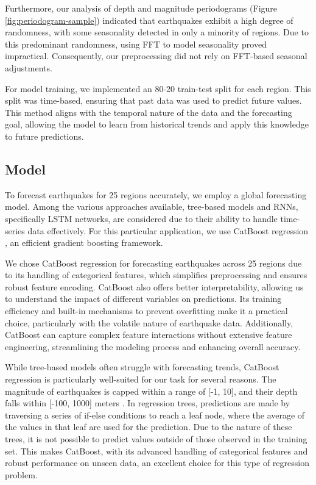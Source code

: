 Furthermore, our analysis of depth and magnitude periodograms (Figure \ref{fig:periodogram-sample})
indicated that earthquakes
exhibit a high degree of randomness, with some seasonality detected in only a minority
of regions. Due to this predominant randomness, using \ac{FFT}
to model seasonality proved impractical. Consequently, our preprocessing did not
rely on \ac{FFT}-based seasonal adjustments.

For model training, we implemented an 80-20 train-test split for each region. This
split was time-based, ensuring that past data was used to predict future values.
This method aligns with the temporal nature of the data and the forecasting goal,
allowing the model to learn from historical trends and apply this knowledge to
future predictions.

\subsection{Model}

To forecast earthquakes for 25 regions accurately, we employ a global forecasting model.
Among the various approaches available, tree-based models and \ac{RNNs}, specifically
\ac{LSTM} networks, are considered due to their ability to handle time-series data
effectively. For this particular application, we use CatBoost regression
\parencite{prokhorenkova2018catboost}, an efficient gradient boosting framework.

We chose CatBoost regression for forecasting earthquakes across 25 regions due to
its handling of categorical features, which simplifies preprocessing and ensures
robust feature encoding. CatBoost also offers better interpretability, allowing us
to understand the impact of different variables on predictions. Its training
efficiency and built-in mechanisms to prevent overfitting make it a practical
choice, particularly with the volatile nature of earthquake data. Additionally,
CatBoost can capture complex feature interactions without extensive feature
engineering, streamlining the modeling process and enhancing overall accuracy.

While tree-based models often struggle with forecasting trends, CatBoost regression
is particularly well-suited for our task for several reasons. The magnitude of
earthquakes is capped within a range of [-1, 10], and their depth falls within
  [-100, 1000] meters \parencite{earthquake-data}. In regression trees, predictions
are made by traversing a series of if-else conditions to reach a leaf node, where
the average of the values in that leaf are used for the prediction. Due to the
nature of these trees, it is not possible to predict values outside of those
observed in the training set. This makes CatBoost, with its advanced handling
of categorical features and robust performance on unseen data, an excellent
choice for this type of regression problem.

